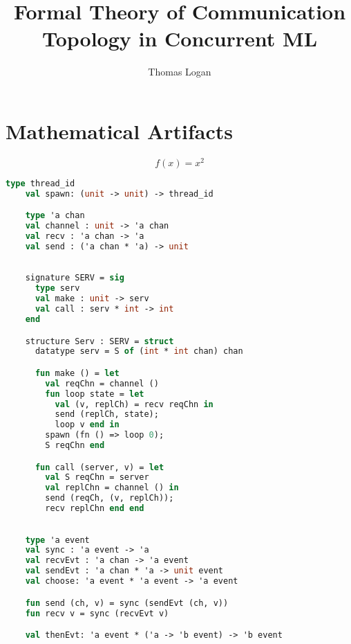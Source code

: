 \documentclass{article}
\title{Formal Theory of Communication Topology in Concurrent ML}
\author{Thomas Logan}
\begin{document}
  \maketitle

  \newpage

  \section{Mathematical Artifacts}

  \begin{equation*}
    f(x) = x^2
    \end{equation*}

  \begin{lstlisting}[language=ML, style=codestyle1]
    type thread_id
    val spawn: (unit -> unit) -> thread_id

    type 'a chan
    val channel : unit -> 'a chan
    val recv : 'a chan -> 'a
    val send : ('a chan * 'a) -> unit
    \end{lstlisting}

  \begin{lstlisting}[language=ML, style=codestyle1]

    signature SERV = sig 
      type serv
      val make : unit -> serv
      val call : serv * int -> int
    end

    structure Serv : SERV = struct 
      datatype serv = S of (int * int chan) chan 

      fun make () = let 
        val reqChn = channel ()
        fun loop state = let
          val (v, replCh) = recv reqChn in 
          send (replCh, state);
          loop v end in
        spawn (fn () => loop 0);
        S reqChn end 

      fun call (server, v) = let 
        val S reqChn = server
        val replChn = channel () in 
        send (reqCh, (v, replCh));
        recv replChn end end

    \end{lstlisting}

  \begin{lstlisting}[language=ML, style=codestyle1]

    type 'a event
    val sync : 'a event -> 'a
    val recvEvt : 'a chan -> 'a event
    val sendEvt : 'a chan * 'a -> unit event
    val choose: 'a event * 'a event -> 'a event

    fun send (ch, v) = sync (sendEvt (ch, v))
    fun recv v = sync (recvEvt v)

    val thenEvt: 'a event * ('a -> 'b event) -> 'b event

    \end{lstlisting}
\end{document}
